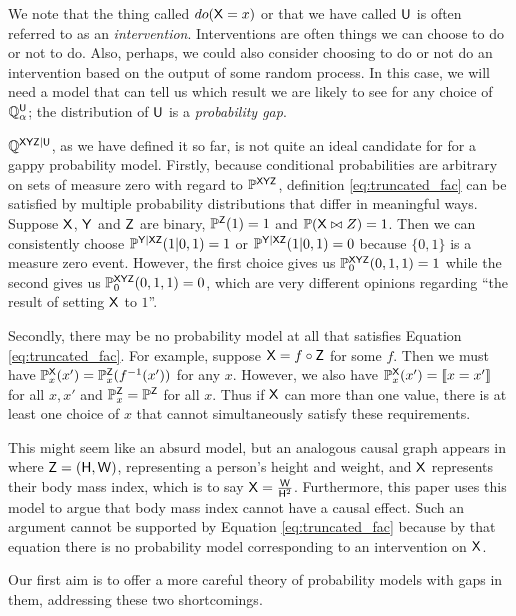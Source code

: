 We note that the thing called $do(\mathsf{X}=x)$ or that we have called $\mathsf{U}$ is often referred to as an \emph{intervention}. Interventions are often things we can choose to do or not to do. Also, perhaps, we could also consider choosing to do or not do an intervention based on the output of some random process. In this case, we will need a model that can tell us which result we are likely to see for any choice of $\mathbb{Q}_\alpha^{\mathsf{U}}$; the distribution of $\mathsf{U}$ is a \emph{probability gap}.

$\mathbb{Q}^{\mathsf{XYZ}|\mathsf{U}}$, as we have defined it so far, is not quite an ideal candidate for for a gappy probability model. Firstly, because conditional probabilities are arbitrary on sets of measure zero with regard to $\mathbb{P}^{\mathsf{XYZ}}$, definition \ref{eq:truncated_fac} can be satisfied by multiple probability distributions that differ in meaningful ways. Suppose $\mathsf{X}$, $\mathsf{Y}$ and $\mathsf{Z}$ are binary, $\mathbb{P}^{\mathsf{Z}}(1)=1$ and $\mathbb{P}(\mathsf{X}\bowtie{Z})=1$. Then we can consistently choose $\mathbb{P}^{\mathsf{Y|XZ}}(1|0,1)=1$ or $\mathbb{P}^{\mathsf{Y|XZ}}(1|0,1)=0$ because $\{0,1\}$ is a measure zero event. However, the first choice gives us  $\mathbb{P}^{\mathsf{XYZ}}_{0}(0,1,1)=1$ while the second gives us $\mathbb{P}^{\mathsf{XYZ}}_{0}(0,1,1)=0$, which are very different opinions regarding ``the result of setting $\mathsf{X}$ to $1$''.

Secondly, there may be no probability model at all that satisfies Equation \ref{eq:truncated_fac}. For example, suppose $\mathsf{X}=f\circ\mathsf{Z}$ for some $f$. Then we must have $\mathbb{P}^{\mathsf{X}}_x(x')=\mathbb{P}^{\mathsf{Z}}_x(f^{-1}(x'))$ for any $x$. However, we also have $\mathbb{P}^{\mathsf{X}}_x(x')=\llbracket x = x' \rrbracket$ for all $x,x'$ and $\mathbb{P}^{\mathsf{Z}}_x=\mathbb{P}^{\mathsf{Z}}$ for all $x$. Thus if $\mathsf{X}$ can more than one value, there is at least one choice of $x$ that cannot simultaneously satisfy these requirements.

This might seem like an absurd model, but an analogous causal graph appears in \citet{shahar_association_2009} where $\mathsf{Z}=(\mathsf{H},\mathsf{W})$, representing a person's height and weight, and $\mathsf{X}$ represents their body mass index, which is to say $\mathsf{X}=\frac{\mathsf{W}}{\mathsf{H}^2}$. Furthermore, this paper uses this model to argue that body mass index cannot have a causal effect. Such an argument cannot be supported by Equation \ref{eq:truncated_fac} because by that equation there is no probability model corresponding to an intervention on $\mathsf{X}$.

Our first aim is to offer a more careful theory of probability models with gaps in them, addressing these two shortcomings.

